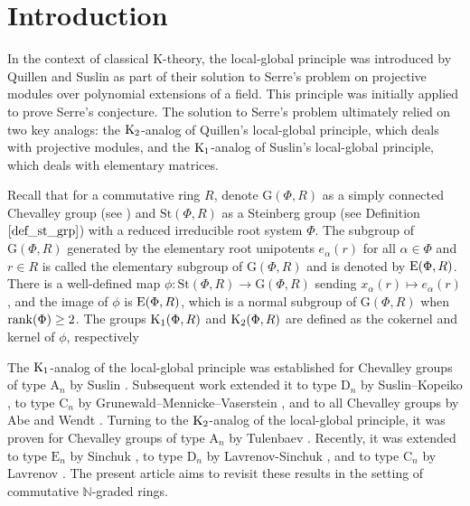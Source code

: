 \documentclass[11pt]{amsart}
\theoremstyle{definition}
\numberwithin{equation}{section}
\numberwithin{equation}{section}
\newcommand{\N}{{\mathbb N}}
\newcommand{\A}{\mathrm{A}}
\newcommand{\C}{\mathrm{C}}
\newcommand{\D}{\mathrm{D}}
\newcommand{\E}{\mathrm{E}}
\newcommand{\G}{\mathrm{G}}
\newcommand{\rank}{{\rm rank}}
\newcommand{\<}{\langle}
\renewcommand{\>}{\rangle}
\newcommand{\El}{{\operatorname{\rm E}}}
\newcommand{\K}{{\operatorname{\rm K}}}
\newcommand{\St}{\mathrm{St}}
\begin{document}
\section{Introduction}\label{sec:Intro}
In the context of classical K-theory, the local-global principle was introduced by Quillen \cite{Qu76} and Suslin \cite{Su77} as part of their solution to Serre’s problem on projective modules over polynomial extensions of a field. This principle was initially applied to prove Serre’s conjecture. The solution to Serre’s problem ultimately relied on two key analogs: the $\K_{2}$-analog of Quillen’s local-global principle, which deals with projective modules, and the $\K_{1}$-analog of Suslin's local-global principle, which deals with elementary matrices.\par
Recall that for a commutative ring $R$, denote $\G(\Phi,R)$ as a simply connected Chevalley group (see \cite{St68}) and $\St(\Phi,R)$ as a Steinberg group (see Definition $\ref{def_st_grp}$) with a reduced irreducible root system $\Phi$. The subgroup of $\G(\Phi,R)$ generated by the elementary root unipotents $e_{\alpha}(r)$ for all $\alpha\in\Phi$ and $r\in R$ is called the elementary subgroup of $\G(\Phi,R)$ and is denoted by $\El(\Phi,R)$. There is a well-defined map $\phi:\St(\Phi,R)\to\G(\Phi,R)$ sending $x_{\alpha}(r)\mapsto e_{\alpha}(r)$, and the image of $\phi$ is $\El(\Phi,R)$, which is a normal subgroup of $\G(\Phi,R)$ when $\rank(\Phi)\geq 2$. The groups $\K_{1}(\Phi,R)$ and $\K_{2}(\Phi,R)$ are defined as the cokernel and kernel of $\phi$, respectively
\begin{center}
\end{center}
The $\K_{1}$-analog of the local-global principle was established for Chevalley groups of type $\A_{n}$ by Suslin \cite{Su77}. Subsequent work extended it to type $\D_{n}$ by Suslin–Kopeiko \cite{SuKo82}, to type $\C_{n}$ by Grunewald–Mennicke–Vaserstein \cite{GMV91}, and to all  Chevalley groups by Abe \cite{Ab83} and Wendt \cite{We10}. Turning to the $\K_{2}$-analog of the local-global principle, it was proven for Chevalley groups of type $\A_{n}$ by Tulenbaev \cite{Tu83}. Recently, it was extended to type $\E_{n}$ by Sinchuk \cite{Si16}, to type $\D_{n}$ by Lavrenov-Sinchuk \cite{LaSi17}, and to type $\C_{n}$ by Lavrenov \cite{La18}. The present article aims to revisit these results in the setting of commutative $\N$-graded rings.\par
\end{document}

